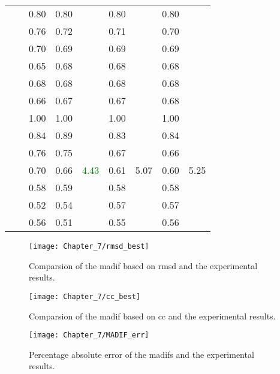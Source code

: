 \begin{table}
\begin{tabular}{ccccccccc}
		& & 0.80 & 0.80 & & 0.80 & & 0.80 & \\
		& & 0.76 & 0.72 & & 0.71 & & 0.70 & \\
		& & 0.70 & 0.69 & & 0.69 & & 0.69 & \\
		& & 0.65 & 0.68 & & 0.68 & & 0.68 & \\
		& & 0.68 & 0.68 & & 0.68 & & 0.68 & \\
		& & 0.66 & 0.67 & & 0.67 & & 0.68 & \\
		\cline{2-9}
		& \multirow{7}{*}{\rotatebox[origin=c]{90}{\ac{hcgm} - interface}}& 1.00 & 1.00 & \multirow{7}{*}{\textcolor{green}{4.43}} & 1.00 & \multirow{7}{*}{5.07} & 1.00 & \multirow{7}{*}{5.25} \\
		& & 0.84 & 0.89 & & 0.83 & & 0.84 & \\
		& & 0.76 & 0.75 & & 0.67 & & 0.66 & \\
		& & 0.70 & 0.66 & & 0.61 & & 0.60 & \\
		& & 0.58 & 0.59 & & 0.58 & & 0.58 & \\
		& & 0.52 & 0.54 & & 0.57 & & 0.57 & \\
		& & 0.56 & 0.51 & & 0.55 & & 0.56 & \\
		\bottomrule
	\end{tabular}
\end{table}

\begin{figure}
	\begin{center}
		\texttt{[image: Chapter\_7/rmsd\_best]}
	\end{center}
	\caption{Comparsion of the \acf{madif} based on \acf{rmsd} and the experimental results.}
	\label{fig:madif_rmsd_best}
\end{figure}
\begin{figure}
	\begin{center}
		\texttt{[image: Chapter\_7/cc\_best]}
	\end{center}
	\caption{Comparsion of the \acf{madif} based on \acf{cc} and the experimental results.}
	\label{fig:madif_cc_best}
\end{figure}
\begin{figure}
	\begin{center}
		\texttt{[image: Chapter\_7/MADIF\_err]}
	\end{center}
	\caption{Percentage absolute error of the \acfp{madif} and the experimental results.}
	\label{fig:madif_err}
\end{figure}


